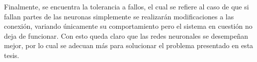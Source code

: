  		Finalmente, se encuentra la tolerancia a fallos, el cual se refiere al caso
 	de que si fallan partes de las neuronas simplemente se realizar\'{a}n
 	modificaciones a las conexi\'{o}n, variando \'{u}nicamente su comportamiento
 	pero el sistema en cuesti\'{o}n no deja de funcionar. Con esto queda claro que
 	las redes neuronales se desempe\~{n}an mejor, por lo cual se adecuan
 	m\'{a}s para solucionar el problema presentado en esta tesis.
 	

